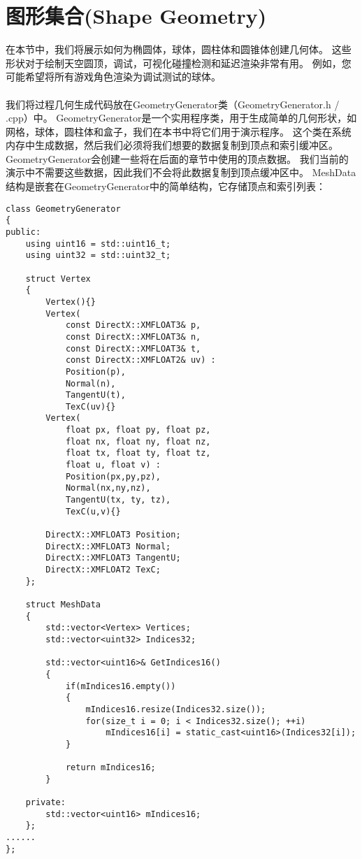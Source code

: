 \section{图形集合(Shape Geometry)}
\begin{flushleft}
在本节中，我们将展示如何为椭圆体，球体，圆柱体和圆锥体创建几何体。 这些形状对于绘制天空圆顶，调试，可视化碰撞检测和延迟渲染非常有用。 例如，您可能希望将所有游戏角色渲染为调试测试的球体。\\
~\\
我们将过程几何生成代码放在GeometryGenerator类（GeometryGenerator.h / .cpp）中。 GeometryGenerator是一个实用程序类，用于生成简单的几何形状，如网格，球体，圆柱体和盒子，我们在本书中将它们用于演示程序。 这个类在系统内存中生成数据，然后我们必须将我们想要的数据复制到顶点和索引缓冲区。 GeometryGenerator会创建一些将在后面的章节中使用的顶点数据。 我们当前的演示中不需要这些数据，因此我们不会将此数据复制到顶点缓冲区中。 MeshData结构是嵌套在GeometryGenerator中的简单结构，它存储顶点和索引列表：\\
\end{flushleft}
\begin{lstlisting}
class GeometryGenerator
{
public:
    using uint16 = std::uint16_t;
    using uint32 = std::uint32_t;

    struct Vertex
    {
        Vertex(){}
        Vertex(
            const DirectX::XMFLOAT3& p, 
            const DirectX::XMFLOAT3& n, 
            const DirectX::XMFLOAT3& t, 
            const DirectX::XMFLOAT2& uv) :
            Position(p), 
            Normal(n), 
            TangentU(t), 
            TexC(uv){}
        Vertex(
            float px, float py, float pz, 
            float nx, float ny, float nz,
            float tx, float ty, float tz,
            float u, float v) : 
            Position(px,py,pz), 
            Normal(nx,ny,nz),
            TangentU(tx, ty, tz), 
            TexC(u,v){}

        DirectX::XMFLOAT3 Position;
        DirectX::XMFLOAT3 Normal;
        DirectX::XMFLOAT3 TangentU;
        DirectX::XMFLOAT2 TexC;
    };

    struct MeshData
    {
        std::vector<Vertex> Vertices;
        std::vector<uint32> Indices32;

        std::vector<uint16>& GetIndices16()
        {
            if(mIndices16.empty())
            {
                mIndices16.resize(Indices32.size());
                for(size_t i = 0; i < Indices32.size(); ++i)
                    mIndices16[i] = static_cast<uint16>(Indices32[i]);
            }

            return mIndices16;
        }

    private:
        std::vector<uint16> mIndices16;
    };
......
};
\end{lstlisting}
